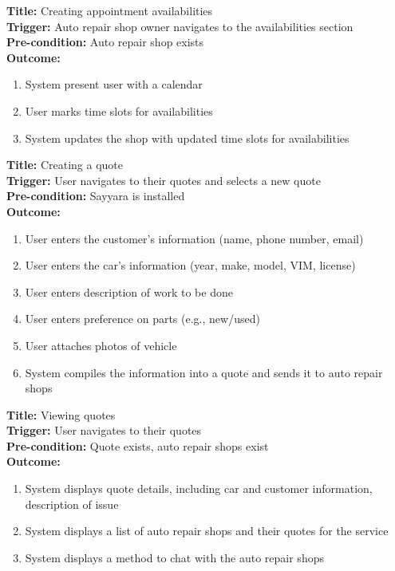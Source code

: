 \documentclass[12pt]{article}
\begin{document}
\textbf{Title:} Creating appointment availabilities\\
\textbf{Trigger:} Auto repair shop owner navigates to the availabilities section\\
\textbf{Pre-condition:} Auto repair shop exists\\
\textbf{Outcome:}
\begin{enumerate}
	\item System present user with a calendar
	\item User marks time slots for availabilities
	\item System updates the shop with updated time slots for availabilities
\end{enumerate}

\textbf{Title:} Creating a quote\\
\textbf{Trigger:} User navigates to their quotes and selects a new quote\\
\textbf{Pre-condition:} Sayyara is installed\\
\textbf{Outcome:}
\begin{enumerate}
	\item User enters the customer's information (name, phone number, email)
	\item User enters the car's information (year, make, model, VIM, license)
	\item User enters description of work to be done
	\item User enters preference on parts (e.g., new/used)
	\item User attaches photos of vehicle
	\item System compiles the information into a quote and sends it to auto repair shops
\end{enumerate}

\textbf{Title:} Viewing quotes\\
\textbf{Trigger:} User navigates to their quotes\\
\textbf{Pre-condition:} Quote exists, auto repair shops exist\\
\textbf{Outcome:}
\begin{enumerate}
	\item System displays quote details, including car and customer information, description of issue
	\item System displays a list of auto repair shops and their quotes for the service
	\item System displays a method to chat with the auto repair shops
\end{enumerate}
\end{document}
